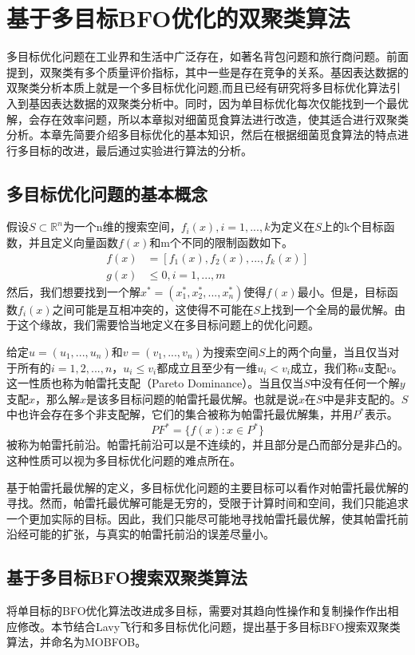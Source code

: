\chapter{基于多目标BFO优化的双聚类算法}
多目标优化问题在工业界和生活中广泛存在，如著名背包问题和旅行商问题。前面提到，双聚类有多个质量评价指标，其中一些是存在竞争的关系。基因表达数据的双聚类分析本质上就是一个多目标优化问题,而且已经有研究将多目标优化算法引入到基因表达数据的双聚类分析中。同时，因为单目标优化每次仅能找到一个最优解，会存在效率问题，所以本章拟对细菌觅食算法进行改造，使其适合进行双聚类分析。本章先简要介绍多目标优化的基本知识，然后在根据细菌觅食算法的特点进行多目标的改进，最后通过实验进行算法的分析。

\section{多目标优化问题的基本概念}
假设$S\subset \mathbb{R}^n$为一个n维的搜索空间，$f_i(x),i=1,...,k$为定义在$S$上的k个目标函数，并且定义向量函数$f(x)$和m个不同的限制函数如下。
\begin{align}
   f(x) &= [f_1(x),f_2(x),...,f_k(x)] \\
    g(x) &\leq 0, i= 1,...,m
\end{align}
然后，我们想要找到一个解$x^{\ast} =(x_1^{\ast},x_2^{\ast},...,x_n^{\ast})$使得$f(x)$最小。但是，目标函数$f_i(x)$之间可能是互相冲突的，这使得不可能在$S$上找到一个全局的最优解。由于这个缘故，我们需要恰当地定义在多目标问题上的优化问题。

给定$u=(u_1,...,u_n)$和$v=(v_1,...,v_n)$为搜索空间$S$上的两个向量，当且仅当对于所有的$i=1,2,...,n$，$u_i \le v_i$都成立且至少有一维$u_i<v_i$成立，我们称$u$支配$v$。这一性质也称为帕雷托支配（Pareto Dominance）。当且仅当$S$中没有任何一个解$y$支配$x$，那么解$x$是该多目标问题的帕雷托最优解。也就是说$x$在$S$中是非支配的。$S$中也许会存在多个非支配解，它们的集合被称为帕雷托最优解集，并用$P^*$表示。
\begin{equation}
   PF^* = \{f(x): x\in P^*\} 
\end{equation}
被称为帕雷托前沿。帕雷托前沿可以是不连续的，并且部分是凸而部分是非凸的。这种性质可以视为多目标优化问题的难点所在。

基于帕雷托最优解的定义，多目标优化问题的主要目标可以看作对帕雷托最优解的寻找。然而，帕雷托最优解可能是无穷的，受限于计算时间和空间，我们只能追求一个更加实际的目标。因此，我们只能尽可能地寻找帕雷托最优解，使其帕雷托前沿经可能的扩张，与真实的帕雷托前沿的误差尽量小。

\section{基于多目标BFO搜索双聚类算法}
将单目标的BFO优化算法改进成多目标，需要对其趋向性操作和复制操作作出相应修改。本节结合Lavy飞行和多目标优化问题，提出基于多目标BFO搜索双聚类算法，并命名为MOBFOB。

